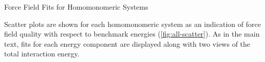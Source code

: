 \begin{section}{Force Field Fits for Homomonomeric Systems}

Scatter plots are shown for each homomonomeric system as
an indication of force field quality with respect to \saptpbeo benchmark energies
(\ref{fig:all-scatter}). 
As in the main text, fits for each energy component are displayed along with
two views of the total interaction energy.  


\end{section}
